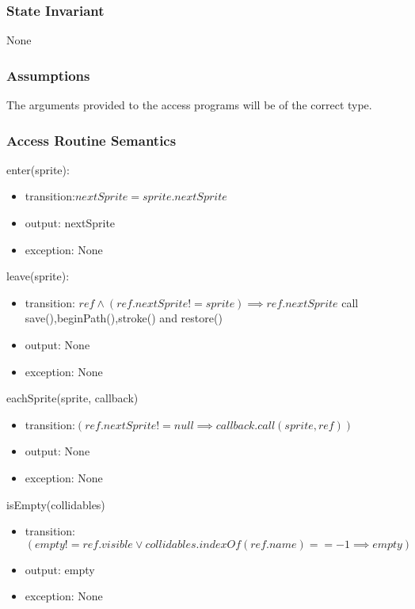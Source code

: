 \documentclass[12pt]{article}
\begin{document}
\subsubsection* {State Invariant}
None

\subsubsection* {Assumptions}

The arguments provided to the access programs will be of the correct type.

\subsubsection* {Access Routine Semantics}

\noindent  enter(sprite):
\begin{itemize}
\item transition:$nextSprite = sprite.nextSprite$
\item output: nextSprite
\item exception: None
\end{itemize}

\noindent  leave(sprite):
\begin{itemize}
\item transition: $ ref \land (ref.nextSprite != sprite) \implies ref.nextSprite$
call save(),beginPath(),stroke() and restore()
\item output: None
\item exception: None
\end{itemize}

\noindent eachSprite(sprite, callback)
\begin{itemize}
\item transition:$(ref.nextSprite != null \implies callback.call(sprite, ref))$
\item output: None
\item exception: None
\end{itemize}

\noindent isEmpty(collidables)
\begin{itemize}
\item transition:$(empty != ref.visible \lor collidables.indexOf(ref.name)==-1 \implies  empty)$
\item output: empty
\item exception: None
\end{itemize}
\end{document}
